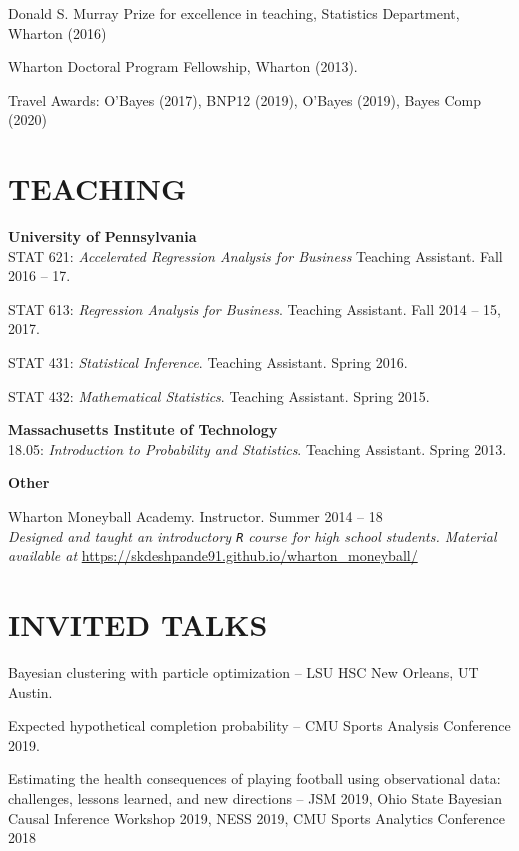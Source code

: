 \documentclass[margin]{res}
\begin{document}
\begin{resume}
Donald S. Murray Prize for excellence in teaching, Statistics Department, Wharton (2016)

Wharton Doctoral Program Fellowship, Wharton (2013).

Travel Awards: O'Bayes (2017), BNP12 (2019), O'Bayes (2019), Bayes Comp (2020)

\section{TEACHING}

\textbf{University of Pennsylvania} \\

STAT 621: {\it Accelerated Regression Analysis for Business} Teaching Assistant. Fall 2016 -- 17.

STAT 613: {\it Regression Analysis for Business}. Teaching Assistant. Fall 2014 -- 15, 2017.

STAT 431: {\it Statistical Inference}. Teaching Assistant. Spring 2016.

STAT 432: {\it Mathematical Statistics}. Teaching Assistant. Spring 2015.


\textbf{Massachusetts Institute of Technology} \\

18.05: {\it Introduction to Probability and Statistics}. Teaching Assistant. Spring 2013.

\textbf{Other}

Wharton Moneyball Academy. Instructor. Summer 2014 -- 18 \\
\textit{Designed and taught an introductory \texttt{R} course for high school students. Material available at}  \url{https://skdeshpande91.github.io/wharton_moneyball/}

\section{INVITED  \hspace{0.1in} TALKS}


Bayesian clustering with particle optimization -- LSU HSC New Orleans, UT Austin. 

Expected hypothetical completion probability -- CMU Sports Analysis Conference 2019.

Estimating the health consequences of playing football using observational data: challenges, lessons learned, and new directions -- JSM 2019, Ohio State Bayesian Causal Inference Workshop 2019, NESS 2019, CMU Sports Analytics Conference 2018


\end{resume}
\end{document}
